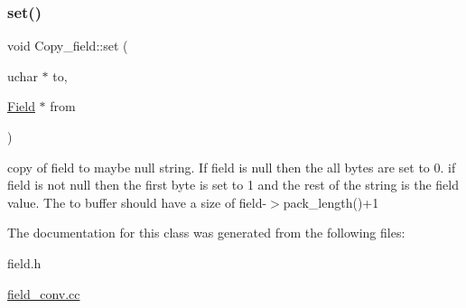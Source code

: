 \subsubsection{\texorpdfstring{set()}{set()}}
{\footnotesize\ttfamily void Copy\+\_\+field\+::set (\begin{DoxyParamCaption}\item[{uchar $\ast$}]{to,  }\item[{\mbox{\hyperlink{classField}{Field}} $\ast$}]{from }\end{DoxyParamCaption})}

copy of field to maybe null string. If field is null then the all bytes are set to 0. if field is not null then the first byte is set to 1 and the rest of the string is the field value. The \textquotesingle{}to\textquotesingle{} buffer should have a size of field-\/$>$pack\+\_\+length()+1 

The documentation for this class was generated from the following files\+:\begin{DoxyCompactItemize}
\item 
field.\+h\item 
\mbox{\hyperlink{field__conv_8cc}{field\+\_\+conv.\+cc}}\end{DoxyCompactItemize}
